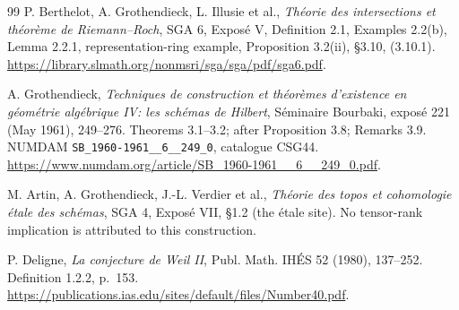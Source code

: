 \documentclass[11pt]{article}
\begin{document}
\begin{thebibliography}{99}
P. Berthelot, A. Grothendieck, L. Illusie et al.,
\emph{Th\'eorie des intersections et th\'eor\`eme de Riemann--Roch},
SGA 6, Expos\'e V, Definition 2.1, Examples 2.2(b),
Lemma 2.2.1, representation-ring example, Proposition 3.2(ii),
\S3.10, (3.10.1).
\url{https://library.slmath.org/nonmsri/sga/sga/pdf/sga6.pdf}.

A. Grothendieck, \emph{Techniques de construction et th\'eor\`emes
d'existence en g\'eom\'etrie alg\'ebrique IV: les sch\'emas de Hilbert},
S\'eminaire Bourbaki, expos\'e 221 (May 1961), 249--276.
Theorems 3.1--3.2; after Proposition 3.8; Remarks 3.9.
NUMDAM \texttt{SB\_1960-1961\_\_6\_\_249\_0}, catalogue CSG44.
\url{https://www.numdam.org/article/SB_1960-1961__6__249_0.pdf}.

M. Artin, A. Grothendieck, J.-L. Verdier et al.,
\emph{Th\'eorie des topos et cohomologie \'etale des sch\'emas},
SGA 4, Expos\'e VII, \S1.2 (the \'etale site).
No tensor-rank implication is attributed to this construction.

P. Deligne, \emph{La conjecture de Weil II},
Publ. Math. IH\'ES 52 (1980), 137--252.
Definition 1.2.2, p.~153.
\url{https://publications.ias.edu/sites/default/files/Number40.pdf}.
\end{thebibliography}
\end{document}
